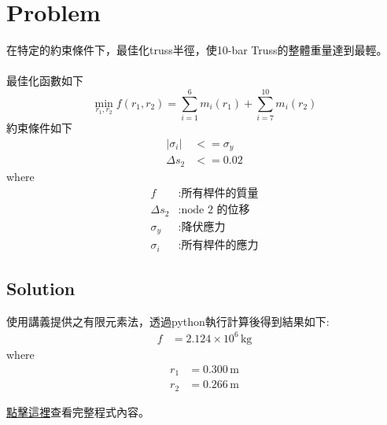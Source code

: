 \documentclass[12pt, a4paper]{article}
\begin{document}
\cfoot{\thepage}



\section{Problem}

在特定的約束條件下，最佳化truss半徑，使10-bar Truss的整體重量達到最輕。\\\\
最佳化函數如下
\begin{equation*}
 	\min_{r_1, r_2} f(r_1, r_2) = \sum_{i=1}^{6}m_i(r_1) + \sum_{i=7}^{10} m_i(r_2)
\end{equation*}
約束條件如下
\begin{equation*}
	\begin{aligned}
		\left| \sigma_i \right| &<= \sigma_y \\
		\Delta s_2 &<= 0.02
	\end{aligned}
\end{equation*}
where
\begin{align*}
    f & : \text{所有桿件的質量} \\
    \Delta s_2 & : \text{node 2 的位移} \\
    \sigma_y & : \text{降伏應力} \\
    \sigma_i & : \text{所有桿件的應力}
\end{align*}

\subsection*{Solution}

使用講義提供之有限元素法，透過python執行計算後得到結果如下:
\begin{align*}
    f &= 2.124 \times 10^6 \, \text{kg}
\end{align*}
where
\begin{align*}
    r_1 & = 0.300 \, \text{m} \\
    r_2 & = 0.266 \, \text{m}
\end{align*}

\href{https://github.com/JerryLee0731/hw_10_Bars_Truss_Optimization}{點擊這裡}查看完整程式內容。


\begingroup  %
    \renewcommand{\section}[2]{}
    
    
\endgroup
\end{document}
